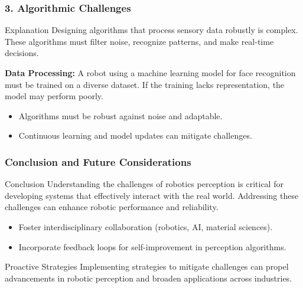\documentclass{beamer}
\begin{document}
\begin{frame}[fragile]
    \frametitle{3. Algorithmic Challenges}
    \begin{block}{Explanation}
        Designing algorithms that process sensory data robustly is complex. These algorithms must filter noise, recognize patterns, and make real-time decisions.
    \end{block}
    \begin{example}
        \textbf{Data Processing:} A robot using a machine learning model for face recognition must be trained on a diverse dataset. If the training lacks representation, the model may perform poorly.
    \end{example}
    \begin{itemize}
        \item Algorithms must be robust against noise and adaptable.
        \item Continuous learning and model updates can mitigate challenges.
    \end{itemize}
\end{frame}

\begin{frame}[fragile]
    \frametitle{Conclusion and Future Considerations}
    \begin{block}{Conclusion}
        Understanding the challenges of robotics perception is critical for developing systems that effectively interact with the real world. Addressing these challenges can enhance robotic performance and reliability.
    \end{block}
    \begin{itemize}
        \item Foster interdisciplinary collaboration (robotics, AI, material sciences).
        \item Incorporate feedback loops for self-improvement in perception algorithms.
    \end{itemize}
    \begin{block}{Proactive Strategies}
        Implementing strategies to mitigate challenges can propel advancements in robotic perception and broaden applications across industries.
    \end{block}
\end{frame}
\end{document}
